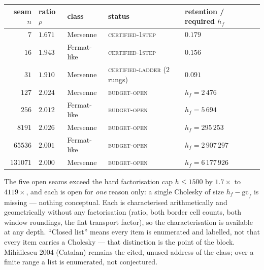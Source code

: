 \documentclass[11pt,a4paper]{article}
\begin{document}
\begin{center}\small
\setlength{\tabcolsep}{5pt}
\begin{tabular}{@{}rllll@{}}
\toprule
seam $n$ & ratio $\rho$ & class & status & retention / required $h_f$\\
\midrule
$7$ & $1.671$ & Mersenne & \textsc{certified-1step} & $0.179$\\
$16$ & $1.943$ & Fermat-like & \textsc{certified-1step} & $0.156$\\
$31$ & $1.910$ & Mersenne & \textsc{certified-ladder} ($2$ rungs) & $0.091$\\
$127$ & $2.024$ & Mersenne & \textsc{budget-open} & $h_f=2\,476$\\
$256$ & $2.012$ & Fermat-like & \textsc{budget-open} & $h_f=5\,694$\\
$8191$ & $2.026$ & Mersenne & \textsc{budget-open} & $h_f=295\,253$\\
$65536$ & $2.001$ & Fermat-like & \textsc{budget-open} & $h_f=2\,907\,297$\\
$131071$ & $2.000$ & Mersenne & \textsc{budget-open} & $h_f=6\,177\,926$\\
\bottomrule
\end{tabular}
\end{center}

\noindent The five open seams exceed the hard factorisation cap $h\le1500$ by $1.7\times$ to
$4119\times$, and each is open for \emph{one} reason only: a single Cholesky of size
$h_f-\mathrm{gc}_f$ is missing --- nothing conceptual. Each is characterised arithmetically and
geometrically without any factorisation (ratio, both border cell counts, both window roundings,
the flat transport factor), so the characterisation is available at any depth. ``Closed list''
means every item is enumerated and labelled, not that every item carries a Cholesky --- that
distinction is the point of the block. Mih\u{a}ilescu 2004 (Catalan) remains the cited, unused
address of the class; over a finite range a list is enumerated, not conjectured.
\end{document}
